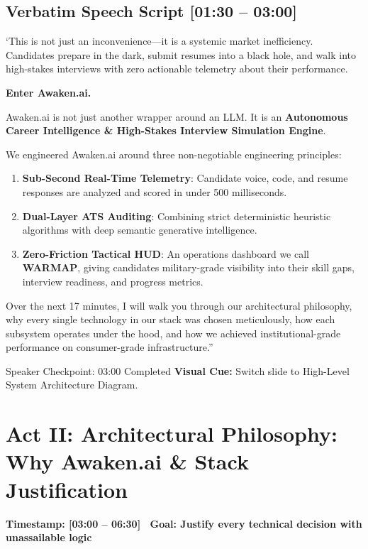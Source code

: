 \documentclass[11pt,a4paper]{article}
\begin{document}
\subsection{Verbatim Speech Script [01:30 -- 03:00]}
`This is not just an inconvenience---it is a systemic market inefficiency. Candidates prepare in the dark, submit resumes into a black hole, and walk into high-stakes interviews with zero actionable telemetry about their performance.

\textbf{Enter Awaken.ai.}

Awaken.ai is not just another wrapper around an LLM. It is an \textbf{Autonomous Career Intelligence \& High-Stakes Interview Simulation Engine}. 

We engineered Awaken.ai around three non-negotiable engineering principles:
\begin{enumerate}
    \item \textbf{Sub-Second Real-Time Telemetry}: Candidate voice, code, and resume responses are analyzed and scored in under 500 milliseconds.
    \item \textbf{Dual-Layer ATS Auditing}: Combining strict deterministic heuristic algorithms with deep semantic generative intelligence.
    \item \textbf{Zero-Friction Tactical HUD}: An operations dashboard we call \textbf{WARMAP}, giving candidates military-grade visibility into their skill gaps, interview readiness, and progress metrics.
\end{enumerate}

Over the next 17 minutes, I will walk you through our architectural philosophy, why every single technology in our stack was chosen meticulously, how each subsystem operates under the hood, and how we achieved institutional-grade performance on consumer-grade infrastructure.''

\begin{timingbox}{Speaker Checkpoint: 03:00 Completed}
\textbf{Visual Cue:} Switch slide to High-Level System Architecture Diagram.
\end{timingbox}

\newpage

\section{Act II: Architectural Philosophy: Why Awaken.ai \& Stack Justification}
\textcolor{accentyellow}{\textbf{Timestamp: [03:00 -- 06:30] \textbar\ Goal: Justify every technical decision with unassailable logic}}
\end{document}
